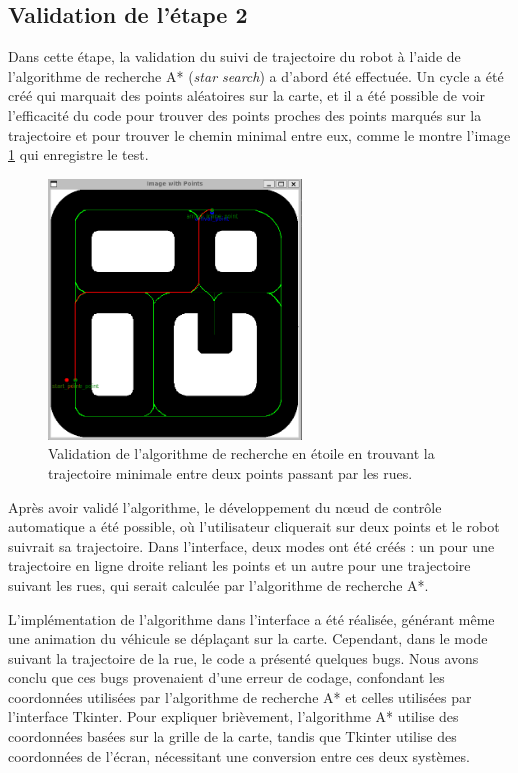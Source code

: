 \FloatBarrier

\subsection{Validation de l'étape 2}

Dans cette étape, la validation du suivi de trajectoire du robot à l'aide de l'algorithme de recherche A* (\textit{star search}) a d'abord été effectuée. Un cycle a été créé qui marquait des points aléatoires sur la carte, et il a été possible de voir l'efficacité du code pour trouver des points proches des points marqués sur la trajectoire et pour trouver le chemin minimal entre eux, comme le montre l'image \ref{img:trajectory} qui enregistre le test.

\begin{figure}[!h]
    \centering
    \includegraphics[width=0.6\textwidth]{img/background/trajectory.png} 
    \caption{Validation de l'algorithme de recherche en étoile en trouvant la trajectoire minimale entre deux points passant par les rues.}
    \label{img:trajectory}
\end{figure}

\FloatBarrier

Après avoir validé l'algorithme, le développement du nœud de contrôle automatique a été possible, où l'utilisateur cliquerait sur deux points et le robot suivrait sa trajectoire. Dans l'interface, deux modes ont été créés : un pour une trajectoire en ligne droite reliant les points et un autre pour une trajectoire suivant les rues, qui serait calculée par l'algorithme de recherche A*. 

L'implémentation de l'algorithme dans l'interface a été réalisée, générant même une animation du véhicule se déplaçant sur la carte. Cependant, dans le mode suivant la trajectoire de la rue, le code a présenté quelques bugs. Nous avons conclu que ces bugs provenaient d'une erreur de codage, confondant les coordonnées utilisées par l'algorithme de recherche A* et celles utilisées par l'interface Tkinter. Pour expliquer brièvement, l'algorithme A* utilise des coordonnées basées sur la grille de la carte, tandis que Tkinter utilise des coordonnées de l'écran, nécessitant une conversion entre ces deux systèmes.

